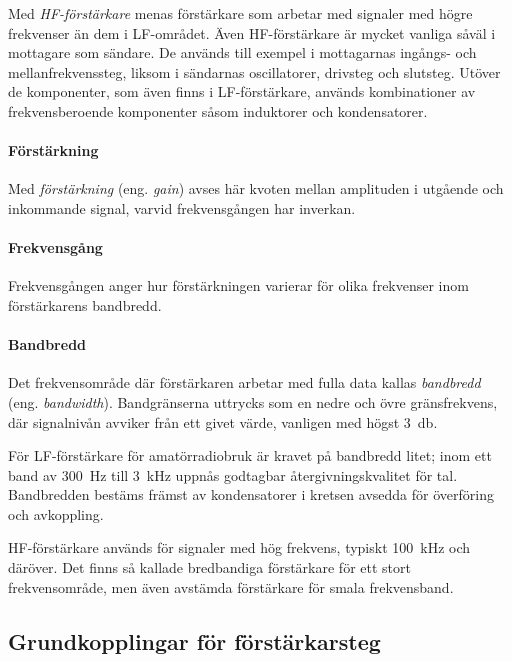 Med \emph{HF-förstärkare} menas förstärkare som arbetar med signaler
med högre frekvenser än dem i LF-området.
Även HF-förstärkare är mycket vanliga såväl i mottagare som sändare.
De används till exempel i mottagarnas ingångs- och mellanfrekvenssteg, liksom i
sändarnas oscillatorer, drivsteg och slutsteg.
Utöver de komponenter, som även finns i LF-förstärkare, används kombinationer
av frekvensberoende komponenter såsom induktorer och kondensatorer.

\paragraph{Förstärkning}

Med \emph{förstärkning} (eng. \emph{gain}) avses här kvoten mellan amplituden i
utgående och inkommande signal, varvid frekvensgången har inverkan.

\paragraph{Frekvensgång}
Frekvensgången anger hur förstärkningen varierar för olika frekvenser inom
förstärkarens bandbredd.

\paragraph{Bandbredd}

Det frekvensområde där förstärkaren arbetar med fulla data kallas
\emph{bandbredd} (eng. \emph{bandwidth}).
Bandgränserna uttrycks som en nedre och övre gränsfrekvens, där signalnivån
avviker från ett givet värde, vanligen med högst \qty{3}{\decibel}.

För LF-förstärkare för amatörradiobruk är kravet på bandbredd litet; inom ett
band av \qty{300}{\hertz} till \qty{3}{\kilo\hertz} uppnås godtagbar
återgivningskvalitet för tal.
Bandbredden bestäms främst av kondensatorer i kretsen avsedda för överföring
och avkoppling.

HF-förstärkare används för signaler med hög frekvens, typiskt
\qty{100}{\kilo\hertz} och däröver.
Det finns så kallade bredbandiga förstärkare för ett stort frekvensområde, men
även avstämda förstärkare för smala frekvensband.

\subsection{Grundkopplingar för förstärkarsteg}
\label{förstärkare_grundkoppling}

